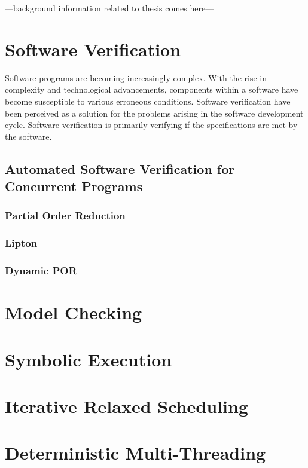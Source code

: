 ---background information related to thesis comes here---
\section{Software Verification}

Software programs are becoming increasingly complex. 
With the rise in complexity and technological advancements, components within a software have become susceptible to various erroneous conditions. 
Software verification have been perceived as a solution for the problems arising in the software development cycle. 
Software verification is primarily verifying if the specifications are met by the software. 



\subsection{Automated Software Verification for Concurrent Programs}
\subsubsection{Partial Order Reduction}
\subsubsection{Lipton}
\subsubsection{Dynamic POR}

\section{Model Checking}
\section{Symbolic Execution}

\section{Iterative Relaxed Scheduling}
\section{Deterministic Multi-Threading}
